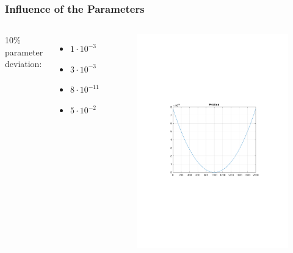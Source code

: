\begin{frame}[c]
	\frametitle{Influence of the Parameters}
	\begin{columns}[c]
			10\% parameter deviation:
			\vspace{.5cm}
			\begin{itemize}
				\item{ $1\cdot 10^{-3}$}
				\item{ $3\cdot 10^{-3}$}
				\item{ $8\cdot 10^{-11}$}
				\item{ $5\cdot 10^{-2}$}
			\end{itemize}
			\vspace{-1.2cm}
			\begin{figure}
				\centering
				\includegraphics[trim=4cm 10cm 4cm 9.5cm, clip=true, width=\linewidth]{img/friction}

\end{figure}
\end{columns}
\end{frame}
